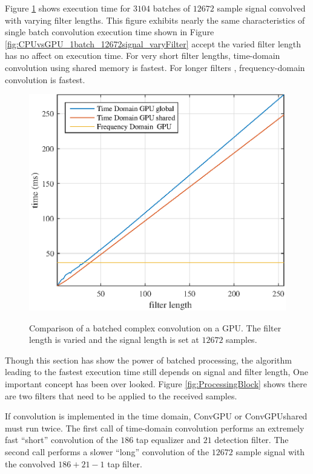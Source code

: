 Figure \ref{fig:CPUvsGPU_3104batch_12672signal_varyFilter} shows execution time for $3104$ batches of $12672$ sample signal convolved with varying filter lengths.
This figure exhibits nearly the same characteristics of single batch convolution execution time shown in Figure \ref{fig:CPUvsGPU_1batch_12672signal_varyFilter} accept the varied filter length has no affect on execution time.
For very short filter lengths, time-domain convolution using shared memory is fastest.
For longer filters , frequency-domain convolution is fastest.
\begin{figure}
	\centering\includegraphics[width=5in]{figures/gpu_intro/CPUvsGPU_3104batch_12672signal_varyFilter.eps}
	\label{fig:CPUvsGPU_3104batch_12672signal_varyFilter}
	\caption{Comparison of a batched complex convolution on a GPU. The filter length is varied and the signal length is set at $12672$ samples.}
\end{figure}

Though this section has show the power of batched processing, the algorithm leading to the fastest execution time still depends on signal and filter length,
One important concept has been over looked.
Figure \ref{fig:ProcessingBlock} shows there are two filters that need to be applied to the received samples. 

If convolution is implemented in the time domain, ConvGPU or ConvGPUshared must run twice.
The first call of time-domain convolution performs an extremely fast ``short'' convolution of the $186$ tap equalizer and $21$ detection filter.
The second call performs a slower ``long'' convolution of the $12672$ sample signal with the  convolved $186+21-1$ tap filter.

